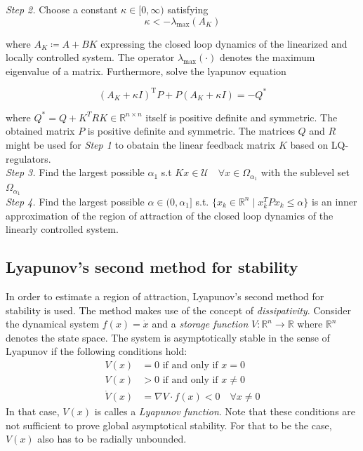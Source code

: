 \documentclass[10pt,a4paper,titlepage]{article}
\begin{document}
\textit{Step 2.} Choose a constant $\kappa \in [0,\infty)$ satisfying
\begin{equation}
	\kappa < -\lambda_{\text{max}}(A_K)
\end{equation}

where $A_K \coloneqq A + BK$ expressing the closed loop dynamics of the linearized and locally controlled system. The operator
$\lambda_{\text{max}}(\cdot)$ denotes the maximum eigenvalue of a matrix. Furthermore, solve the lyapunov equation

\begin{equation}
	\left(A_K+\kappa I\right)^{\mathrm{T}} P+P\left(A_K+\kappa I\right)=-Q^*
\end{equation}

where $Q^* = Q + K^T R K \in \mathbb{R}^{n \times n}$ itself is positive definite and symmetric. The obtained matrix $P$ is 
positive definite and symmetric. The matrices $Q$ and $R$ might be used for \textit{Step 1} to obatain the linear feedback
matrix $K$ based on LQ-regulators.\\

\textit{Step 3.} Find the largest possible $\alpha_1$ s.t $Kx \in \mathcal{U} \quad \forall x \in \Omega_{\alpha_1}$ with the sublevel set $\Omega_{\alpha_1}$\\

\textit{Step 4.} Find the largest possible $\alpha \in (0,\alpha_1]$ s.t. $\{x_k \in \mathbb{R}^n \mid x_k^TPx_k \leq \alpha \}$ is an 
inner approximation of the region of attraction of the closed loop dynamics of the linearly controlled system.


\subsection{Lyapunov's second method for stability}
\label{sec:lyapunov}
In order to estimate a region of attraction, Lyapunov's second method for stability is used. The method makes use of the concept of \textit{dissipativity}.
Consider the dynamical system $f(x) = \dot{x}$ and a \textit{storage function} $V: \mathbb{R}^n \rightarrow \mathbb{R}$ where $\mathbb{R}^n$ denotes the state space.
The system is asymptotically stable in the sense of Lyapunov if the following conditions hold: \cite{cunis_loureiro2023}
\begin{align}
	V(x) &= 0 \text{ if and only if } x=0\\
	V(x) &> 0 \text{ if and only if } x\neq0\\
	\dot{V}(x) &= \nabla V \cdot f(x) < 0 \quad \forall x \neq 0
\end{align}
In that case, $V(x)$ is calles a \textit{Lyapunov function}. Note that these conditions are not sufficient to prove global asymptotical stability.
For that to be the case, $V(x)$ also has to be radially unbounded.
\end{document}
